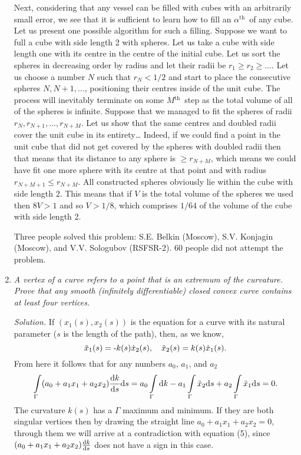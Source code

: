 \documentclass[12pt]{amsart}
\renewcommand{\th}{$^\text{th}$~}
\begin{document}
\begin{enumerate}
Next, considering that any vessel can be filled with cubes with an arbitrarily
small error, we see that it is sufficient to learn how to fill an $\alpha$\th of
any cube.
Let us present one possible algorithm for such a filling.
Suppose we want to full a cube with side length 2 with spheres.
Let us take a cube with side length one with its centre in the centre of the
initial cube.
Let us sort the spheres in decreasing order by radius and let their radii be
$r_1\geq r_2\geq\dots$.
Let us choose a number $N$ such that $r_N<1/2$ and start to place the
consecutive spheres $N,N+1,\dots$, positioning their centres inside of the unit
cube.
The process will inevitably terminate on some $M$\th step as the total volume of
all of the spheres is infinite.
Suppose that we managed to fit the spheres of radii $r_N,r_{N+1},\dots,r_{N+M}$.
Let us show that the same centres and doubled radii cover the unit cube in its
entirety\dots
Indeed, if we could find a point in the unit cube that did not get covered by
the spheres with doubled radii then that means that its distance to any sphere
is $\geq r_{N+M}$, which means we could have fit one more sphere with its centre
at that point and with radius $r_{N+M+1}\leq r_{N+M}$.
All constructed spheres obviously lie within the cube with side length 2.
This means that if $V$ is the total volume of the spheres we used then $8V>1$
and so $V>1/8$, which comprises $1/64$ of the volume of the cube with side
length 2.

Three people solved this problem: S.E. Belkin (Moscow), S.V. Konjagin (Moscow),
and V.V. Sologubov (RSFSR-2).
60 people did not attempt the problem.
\item
\textit{A vertex of a curve refers to a point that is an extremum of the
curvature.
Prove that any smooth (infinitely differentiable) closed convex curve contains
at least four vertices.}

\textit{Solution.}
If $(x_1(s),x_2(s))$ is the equation for a curve with its natural parameter ($s$
is the length of the path), then, as we know,
$$\ddot x_1(s)=\text-k(s)\dot x_2(s),\quad\ddot x_2(s)=k(s)\dot x_1(s).$$
From here it follows that for any numbers $a_0$, $a_1$, and $a_2$
\begin{equation}
\int\limits_\Gamma(a_0+a_1x_1+a_2x_2)\frac{\text dk}{\text ds}\text ds=
a_0\int\limits_\Gamma\text dk-a_1\int\limits_\Gamma\ddot x_2\text ds+
a_2\int\limits_\Gamma\ddot x_1\text ds=0.
\end{equation}
The curvature $k(s)$ has a $\Gamma$ maximum and minimum.
If they are both singular vertices then by drawing the straight line
$a_0+a_1x_1+a_2x_2=0$, through them we will arrive at a contradiction with
equation (5), since $(a_0+a_1x_1+a_2x_2)\frac{\text dk}{\text ds}$ does not have
a sign in this case.


\end{enumerate}
\end{document}
